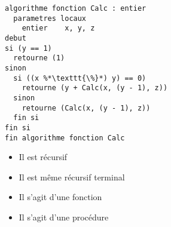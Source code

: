\documentclass[11pt,a4paper]{article}
\begin{document}

\begin{table}[!ht]
  \centering
  \begin{minipage}{0.59\textwidth}
    \centering

\begin{lstlisting}[style=algorithmique]
algorithme fonction Calc : entier
  parametres locaux
    entier    x, y, z
debut
si (y == 1)
  retourne (1)
sinon
  si ((x %*\texttt{\%}*) y) == 0)
    retourne (y + Calc(x, (y - 1), z))
  sinon
    retourne (Calc(x, (y - 1), z))
  fin si
fin si
fin algorithme fonction Calc \end{lstlisting}

\begin{itemize}
  \item[\CaseCoche] Il est récursif  \phantom{lfg}\\
  \item[\CaseCoche] Il est même récursif terminal  \phantom{lfg}\\
  \item[\CaseCoche] Il s'agit d'une fonction  \phantom{lfg}\\
  \item[\CaseCoche] Il s'agit d'une procédure  \phantom{lfg}\\
\end{itemize}


  \end{minipage}
  \hfillx
  \begin{minipage}{0.4\textwidth}
    \centering


\end{minipage}
\end{table}
\end{document}
